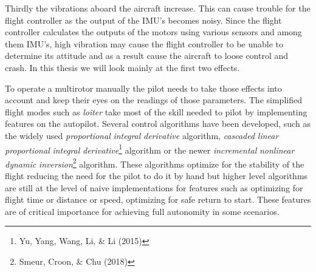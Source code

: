 \documentclass[12pt,oneside]{reedthesis}
\theoremstyle{definition}
\theoremstyle{definition}
\theoremstyle{definition}
\theoremstyle{remark}
\begin{document}
Thirdly the vibrations aboard the aircraft increase. This can cause
trouble for the flight controller as the output of the IMU's becomes
noisy. Since the flight controller calculates the outputs of the motors
using various sensors and among them IMU's, high vibration may cause the
flight controller to be unable to determine its attitude and as a result
cause the aircraft to loose control and crash. In this thesis we will
look mainly at the first two effects.

To operate a multirotor manually the pilot needs to take those effects
into account and keep their eyes on the readings of those parameters.
The simplified flight modes such as \emph{loiter} take most of the skill
needed to pilot by implementing features on the autopilot. Several
control algorithms have been developed, such as the widely used
\emph{proportional} \emph{integral} \emph{derivative} algorithm,
\emph{cascaded} \emph{linear} \emph{proportional} \emph{integral}
\emph{derivative}\footnote{Yu, Yang, Wang, Li, \& Li (2015)} algorithm
or the newer \emph{incremental} \emph{nonlinear} \emph{dynamic}
\emph{inversion}\footnote{Smeur, Croon, \& Chu (2018)} algorithm. These
algorithms optimize for the stability of the flight reducing the need
for the pilot to do it by hand but higher level algorithms are still at
the level of naive implementations for features such as optimizing for
flight time or distance or speed, optimizing for safe return to start.
These features are of critical importance for achieving full autonomity
in some scenarios.
\end{document}
